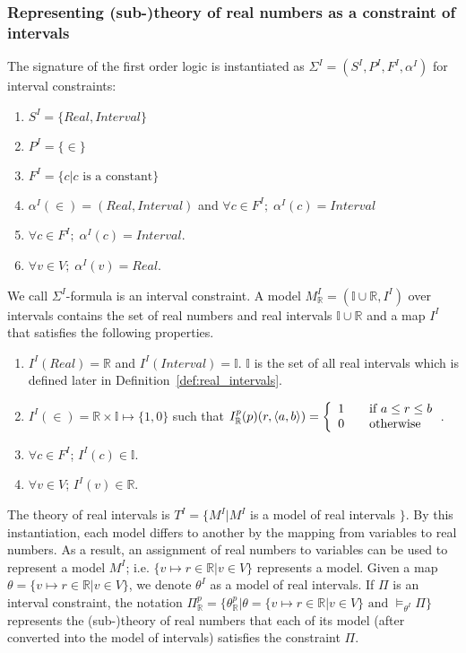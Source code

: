 \subsubsection*{Representing (sub-)theory of real numbers as a constraint of intervals}
The signature of the first order logic is instantiated as $\Sigma^I = (S^I, P^I, F^I, \alpha^I)$ for interval constraints:
\begin{enumerate}
\item $S^I = \{Real, Interval\}$
\item $P^I = \{\in\}$
\item $F^I = \{c | c \text{ is a constant}\}$
\item $\alpha^I(\in) = (Real, Interval)$ and $\forall c \in F^I; \; \alpha^I(c) = Interval$
\item $\forall c \in F^I; \; \alpha^I(c) = Interval$.
\item $\forall v \in V; \; \alpha^I(v) = Real$.
\end{enumerate}
We call $\Sigma^I$-formula is an interval constraint.
A model $M^I_{\mathbb{R}} = (\mathbb{I} \cup \mathbb{R}, I^I)$ over intervals contains the set of real numbers and real intervals $\mathbb{I} \cup \mathbb{R}$ and a map $I^I$ that satisfies the following properties.
\begin{enumerate}
\item $I^I(Real) = \mathbb{R}$ and $I^I(Interval) = \mathbb{I}$. $\mathbb{I}$ is the set of all real intervals which is defined later in Definition~\ref{def:real_intervals}.
\item $I^I(\in) = \mathbb{R} \times \mathbb{I} \mapsto \{1, 0\}$ such that $ I_\mathbb{R}^p(p)(r, \langle a, b \rangle) = \left\{ 
  \begin{array}{c l}
    1 & \quad \text{if } a \le r \le b\\
    0 & \quad \text{otherwise }\\
  \end{array} \right.$.
\item $\forall c \in F^I$; $I^I(c) \in \mathbb{I}$.
\item $\forall v \in V$; $I^I(v) \in \mathbb{R}$.
\end{enumerate}
The theory of real intervals is $T^I = \{M^I | M^I$ is a model of real intervals $\}$.
By this instantiation, each model differs to another by the mapping from variables to real numbers. As a result, an assignment of real numbers to variables can be used to represent a model $M^I$; i.e. $\{v \mapsto r \in \mathbb{R} | v \in V\}$ represents a model. Given a map $\theta = \{v \mapsto r \in \mathbb{R} | v \in V\}$, we denote $\theta^I$ as a model of real intervals. If $\Pi$ is an interval constraint, the notation $\Pi^p_\mathbb{R} = \{\theta^p_\mathbb{R} | \theta = \{v \mapsto r \in \mathbb{R} | v \in V\} \text{ and } \models_{\theta^I} \Pi \}$ represents the (sub-)theory of real numbers that each of its model (after converted into the model of intervals) satisfies the constraint $\Pi$.



